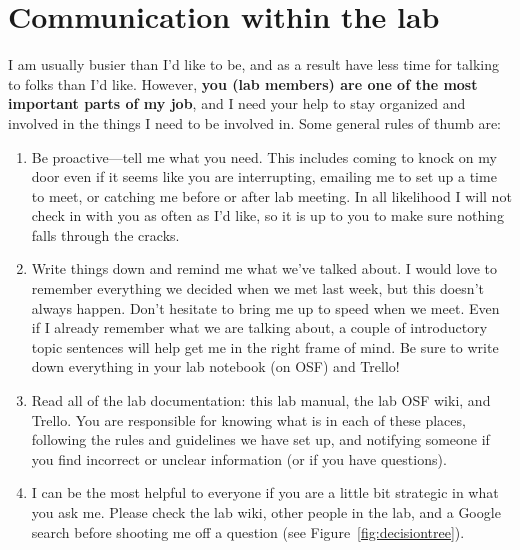 \documentclass[letterpaper,12pt,oneside]{memoir}
\begin{document}
\section{Communication within the lab}
\label{sec:communicationInLab}

I am usually busier than I'd like to be, and as a result have less time for talking to folks than I'd like. However, \textbf{you (lab members) are one of the most important parts of my job}, and I need your help to stay organized and involved in the things I need to be involved in. Some general rules of thumb are:

\begin{enumerate}
\item Be proactive---tell me what you need. This includes coming to knock on my door even if it seems like you are interrupting, emailing me to set up a time to meet, or catching me before or after lab meeting. In all likelihood I will not check in with you as often as I'd like, so it is up to you to make sure nothing falls through the cracks.

\item Write things down and remind me what we've talked about. I would love to remember everything we decided when we met last week, but this doesn't always happen. Don't hesitate to bring me up to speed when we meet. Even if I already remember what we are talking about, a couple of introductory topic sentences will help get me in the right frame of mind. Be sure to write down everything in your lab notebook (on OSF) and Trello!

\item Read all of the lab documentation: this lab manual, the lab OSF wiki, and Trello. You are responsible for knowing what is in each of these places, following the rules and guidelines we have set up, and notifying someone if you find incorrect or unclear information (or if you have questions).

\item I can be the most helpful to everyone if you are a little bit strategic in what you ask me. Please check the lab wiki, other people in the lab, and a Google search before shooting me off a question (see Figure~\ref{fig:decisiontree}).

\end{enumerate}
\end{document}

